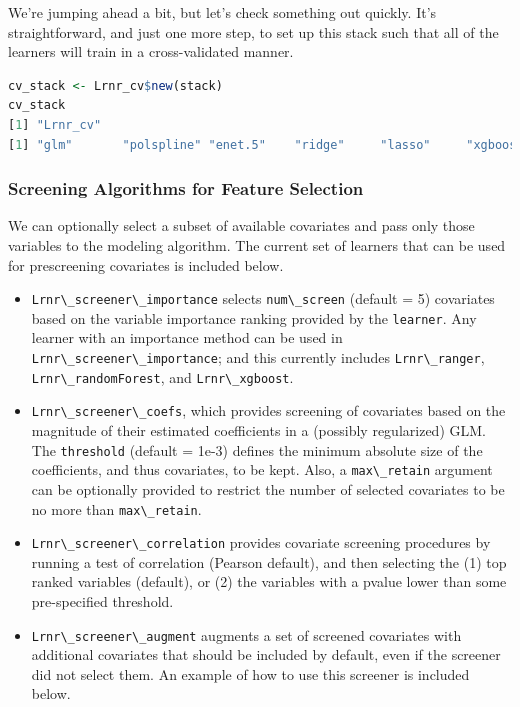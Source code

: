 \documentclass[
  12pt, krantz2,
]{krantz}
\newcommand{\passthrough}[1]{#1}
\providecommand{\tightlist}{%
  \setlength{\itemsep}{0pt}\setlength{\parskip}{0pt}}
\theoremstyle{definition}
\theoremstyle{definition}
\theoremstyle{definition}
\newcommand{\1}{\mathbbm{1}}
\begin{document}
We're jumping ahead a bit, but let's check something out quickly. It's
straightforward, and just one more step, to set up this stack such that
all of the learners will train in a cross-validated manner.

\begin{lstlisting}[language=R]
cv_stack <- Lrnr_cv$new(stack)
cv_stack
[1] "Lrnr_cv"
[1] "glm"       "polspline" "enet.5"    "ridge"     "lasso"     "xgboost50"
\end{lstlisting}

\hypertarget{screening-algorithms-for-feature-selection}{%
\subsubsection*{Screening Algorithms for Feature Selection}\label{screening-algorithms-for-feature-selection}}


We can optionally select a subset of available covariates and pass only
those variables to the modeling algorithm. The current set of learners that
can be used for prescreening covariates is included below.

\begin{itemize}
\tightlist
\item
  \passthrough{\lstinline!Lrnr\_screener\_importance!} selects \passthrough{\lstinline!num\_screen!} (default = 5) covariates
  based on the variable importance ranking provided by the \passthrough{\lstinline!learner!}. Any
  learner with an importance method can be used in \passthrough{\lstinline!Lrnr\_screener\_importance!};
  and this currently includes \passthrough{\lstinline!Lrnr\_ranger!}, \passthrough{\lstinline!Lrnr\_randomForest!}, and
  \passthrough{\lstinline!Lrnr\_xgboost!}.
\item
  \passthrough{\lstinline!Lrnr\_screener\_coefs!}, which provides screening of covariates based on the
  magnitude of their estimated coefficients in a (possibly regularized) GLM.
  The \passthrough{\lstinline!threshold!} (default = 1e-3) defines the minimum absolute size of the
  coefficients, and thus covariates, to be kept. Also, a \passthrough{\lstinline!max\_retain!} argument
  can be optionally provided to restrict the number of selected covariates to be
  no more than \passthrough{\lstinline!max\_retain!}.
\item
  \passthrough{\lstinline!Lrnr\_screener\_correlation!} provides covariate screening procedures by
  running a test of correlation (Pearson default), and then selecting the (1)
  top ranked variables (default), or (2) the variables with a pvalue lower than
  some pre-specified threshold.
\item
  \passthrough{\lstinline!Lrnr\_screener\_augment!} augments a set of screened covariates with additional
  covariates that should be included by default, even if the screener did not
  select them. An example of how to use this screener is included below.
\end{itemize}
\end{document}
